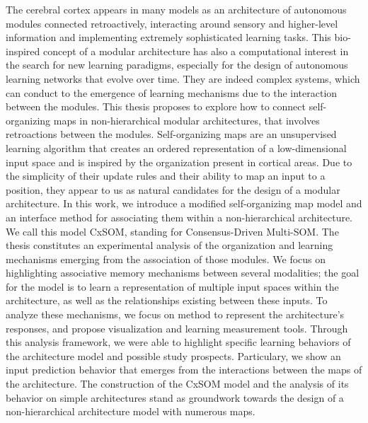 \documentclass[11pt]{thesul-cs}
\begin{document}
\begin{ThesisAbstract}
\begin{FrenchAbstract}
  \end{FrenchAbstract}
  \pagebreak
  \begin{EnglishAbstract}
    The cerebral cortex appears in many models as an architecture of autonomous modules connected retroactively, interacting around sensory and higher-level information and implementing extremely sophisticated learning tasks. 
    This bio-inspired concept of a modular architecture has also a computational interest in the search for new learning paradigms, especially for the design of autonomous learning networks that evolve over time. They are indeed complex systems, which can conduct to the emergence of learning mechanisms due to the interaction between the modules.
    This thesis proposes to explore how to connect self-organizing maps in non-hierarchical modular architectures, that involves retroactions between the modules. 
    Self-organizing maps are an unsupervised learning algorithm that creates an ordered representation of a low-dimensional input space and is inspired by the organization present in cortical areas. 
    Due to the simplicity of their update rules and their ability to map an input to a position, they appear to us as natural candidates for the design of a modular architecture.
    In this work, we introduce a modified self-organizing map model and an interface method for associating them within a non-hierarchical architecture. We call this model CxSOM, standing for Consensus-Driven Multi-SOM.
    The thesis constitutes an experimental analysis of the organization and learning mechanisms emerging from the association of those modules. 
    We focus on highlighting associative memory mechanisms between several modalities; the goal for the model is to learn a representation of multiple input spaces within the architecture, as well as the relationships existing between these inputs.
    To analyze these mechanisms, we focus on method to represent the architecture's responses, and propose visualization and learning measurement tools. Through this analysis framework, we were able to highlight specific learning behaviors of the architecture model and possible study prospects. Particulary, we show an input prediction behavior that emerges from the interactions between the maps of the architecture.
    The construction of the CxSOM model and the analysis of its behavior on simple architectures stand as  groundwork towards the design of a non-hierarchical architecture model with numerous maps.
   
    \end{EnglishAbstract}
  \end{ThesisAbstract}
\end{document}
